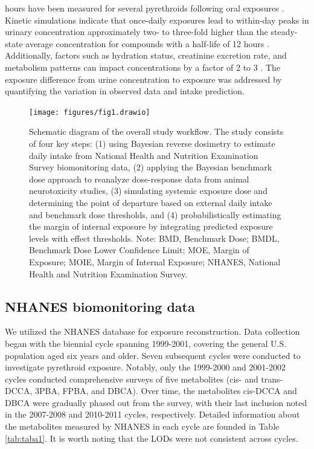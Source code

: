 \documentclass[toxics,article,submit,pdftex,moreauthors]{Definitions/mdpi}
\begin{document}
\begin{itemize}
  hours have been measured for several pyrethroids following oral
  exposures \citep{leng1997biological, woollen_metabolism_1992}. Kinetic
  simulations indicate that once-daily exposures lead to within-day
  peaks in urinary concentration approximately two- to three-fold higher
  than the steady-state average concentration for compounds with a
  half-life of 12 hours \citep{aylward_screening_level_2018}.
  Additionally, factors such as hydration status, creatinine excretion
  rate, and metabolism patterns can impact concentrations by a factor of
  2 to 3 \citep{scher2007agreement}. The exposure difference from urine
  concentration to exposure was addressed by quantifying the variation
  in observed data and intake prediction.
\end{itemize}

\begin{figure}[H]
\centering
\begin{adjustwidth}{-4cm}{}
\centering
\texttt{[image: figures/fig1.drawio]}
\hfill
\end{adjustwidth}
\caption{Schematic diagram of the overall study workflow. The study consists of 
four key steps: (1) using Bayesian reverse dosimetry to estimate daily intake from 
National Health and Nutrition Examination Survey biomonitoring data, (2) applying 
the Bayesian benchmark dose approach to reanalyze dose-response data from animal 
neurotoxicity studies, (3) simulating systemic exposure dose and determining the 
point of departure based on external daily intake and benchmark dose thresholds, 
and (4) probabilistically estimating the margin of internal exposure by integrating 
predicted exposure levels with effect thresholds. Note: BMD, Benchmark Dose; BMDL, Benchmark Dose Lower Confidence Limit; MOE, Margin of Exposure; MOIE, Margin of Internal Exposure; NHANES, National Health and Nutrition Examination Survey.\label{fig1}}
\end{figure}


\subsection{NHANES biomonitoring data}\label{nhanes-biomonitoring-data}

We utilized the NHANES database for exposure reconstruction. Data
collection began with the biennial cycle spanning 1999-2001, covering
the general U.S. population aged six years and older. Seven subsequent
cycles were conducted to investigate pyrethroid exposure. Notably, only
the 1999-2000 and 2001-2002 cycles conducted comprehensive surveys of
five metabolites (cis- and trans-DCCA, 3PBA, FPBA, and DBCA). Over time,
the metabolites cis-DCCA and DBCA were gradually phased out from the
survey, with their last inclusion noted in the 2007-2008 and 2010-2011
cycles, respectively. Detailed information about the metabolites
measured by NHANES in each cycle are founded in Table \ref{tab:taba1}.
It is worth noting that the LODs were not consistent across cycles.
\end{document}
